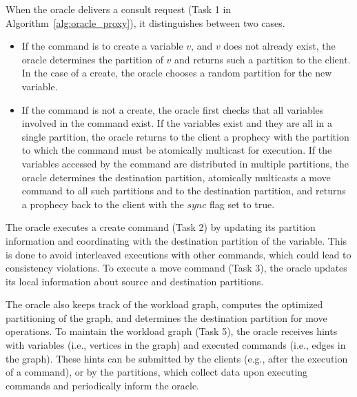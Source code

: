When the oracle delivers a consult request (Task 1 in Algorithm~\ref{alg:oracle_proxy}), it distinguishes between two cases.
\begin{itemize}
\item If the command is to create a variable $v$, and $v$ does not already exist, the oracle determines the partition of $v$ and returns such a partition to the client.
In the case of a create, the oracle chooses a random partition for the new variable.
\item If the command is not a create, the oracle first checks that all variables involved in the command exist.
If the variables exist and they are all in a single partition, the oracle returns to the client a prophecy with the partition to which the command must be atomically multicast for execution.
If the variables accessed by the command are distributed in multiple partitions, the oracle determines the destination partition, atomically multicasts a move command to all such partitions and to the destination partition, and returns a prophecy back to the client with the $sync$ flag set to true.
\end{itemize}

The oracle executes a create command (Task 2) by updating its partition information and coordinating with the destination partition of the variable.
This is done to avoid interleaved executions with other commands, which could lead to consistency violations. 
To execute a move command (Task 3), the oracle updates its local information about source and destination partitions.

The oracle also keeps track of the workload graph, computes the optimized partitioning of the graph, and determines the destination partition for move operations. %
To maintain the workload graph (Task 5), the oracle receives hints with variables (i.e., vertices in the graph) and executed commands (i.e., edges in the graph).
These hints can be submitted by the clients (e.g., after the execution of a command), or by the partitions, which collect data upon executing commands and periodically inform the oracle.

